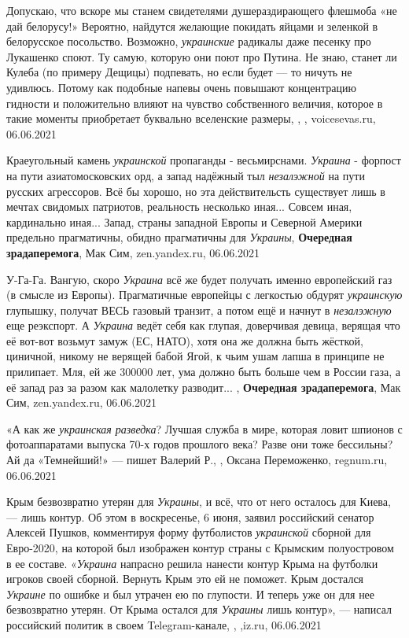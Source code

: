 Допускаю, что вскоре мы станем свидетелями душераздирающего флешмоба «не дай
белорусу!» Вероятно, найдутся желающие покидать яйцами и зеленкой в белорусское
посольство.  Возможно, \emph{украинские} радикалы даже песенку про Лукашенко
споют. Ту самую, которую они поют про Путина. Не знаю, станет ли Кулеба (по
примеру Дещицы) подпевать, но если будет — то ничуть не удивлюсь. Потому как
подобные напевы очень повышают концентрацию гидности и положительно влияют на
чувство собственного величия, которое в такие моменты приобретает буквально
вселенские размеры,
, , voicesevas.ru, 06.06.2021

Краеугольный камень \emph{украинской} пропаганды - весьмирснами. \emph{Украина}
- форпост на пути азиатомосковских орд, а запад надёжный тыл \emph{незалэжной}
на пути русских агрессоров.  Всё бы хорошо, но эта действительсть существует
лишь в мечтах свидомых патриотов, реальность несколько иная... Совсем иная,
кардинально иная...  Запад, страны западной Европы и Северной Америки предельно
прагматичны, обидно прагматичны для \emph{Украины},
\textbf{Очередная зрадаперемога}, Мак Сим, zen.yandex.ru, 06.06.2021

У-Га-Га. Вангую, скоро \emph{Украина} всё же будет получать именно европейский
газ (в смысле из Европы). Прагматичные европейцы с легкостью обдурят
\emph{украинскую} глупышку, получат ВЕСЬ газовый транзит, а потом ещё и начнут
в \emph{незалэжную} еще реэкспорт. А \emph{Украина} ведёт себя как глупая, доверчивая
девица, верящая что её вот-вот возьмут замуж (ЕС, НАТО), хотя она же должна
быть жёсткой, циничной, никому не верящей бабой Ягой, к чьим ушам лапша в
принципе не прилипает. Мля, ей же 300000 лет, ума должно быть больше чем в
России газа, а её запад раз за разом как малолетку разводит... ,
\textbf{Очередная зрадаперемога}, Мак Сим, zen.yandex.ru, 06.06.2021

«А как же \emph{украинская разведка}? Лучшая служба в мире, которая ловит шпионов с
фотоаппаратами выпуска 70-х годов прошлого века? Разве они тоже бессильны? Ай
да «Темнейший!» — пишет Валерий Р.,
, Оксана Переможенко, regnum.ru, 06.06.2021

Крым безвозвратно утерян для \emph{Украины}, и всё, что от него осталось для Киева, —
лишь контур. Об этом в воскресенье, 6 июня, заявил российский сенатор Алексей
Пушков, комментируя форму футболистов \emph{украинской} сборной для Евро-2020, на
которой был изображен контур страны с Крымским полуостровом в ее составе.
«\emph{Украина} напрасно решила нанести контур Крыма на футболки игроков своей
сборной. Вернуть Крым это ей не поможет. Крым достался \emph{Украине} по ошибке и был
утрачен ею по глупости. И теперь уже он для нее безвозвратно утерян. От Крыма
остался для \emph{Украины} лишь контур», — написал российский политик в своем
Telegram-канале,
, ,iz.ru, 06.06.2021

